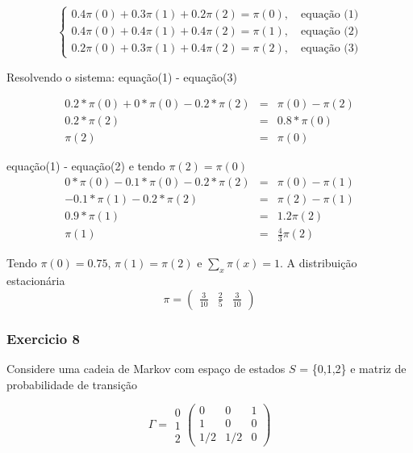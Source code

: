 \documentclass[
]{article}
\begin{document}
\[ \begin{cases}0.4 \pi(0) + 0.3\pi(1) + 0.2\pi(2) = \pi(0), \quad \text{equação (1)} \\
  0.4 \pi(0) + 0.4\pi(1) + 0.4\pi(2) = \pi(1), \quad \text{equação (2)}  \\
  0.2 \pi(0) + 0.3\pi(1) + 0.4\pi(2) = \pi(2), \quad \text{equação (3)}  
  \end{cases}\]

Resolvendo o sistema: equação(1) - equação(3)

\[\begin{array}{rcl} 0.2*\pi(0) + 0*\pi(0) -0.2*\pi(2) &=& \pi(0) -\pi(2)\\
  0.2*\pi(2) &=& 0.8*\pi(0) \\
  \pi(2) &=& \pi(0)
  \end{array} \]

equação(1) - equação(2) e tendo \(\pi(2) = \pi(0)\)
\[ \begin{array}{rcl} 0*\pi(0) - 0.1*\pi(0) -0.2*\pi(2) &=& \pi(0) -\pi(1)\\
  -0.1*\pi(1) - 0.2 * \pi(2) &=& \pi(2) - \pi(1) \\
  0.9*\pi(1)  &=& 1.2 \pi(2) \\
    \pi(1) &=& \frac{4}{3} \pi(2)  \end{array} \]

Tendo \(\pi(0) = 0.75\), \(\pi(1) = \pi(2)\) e \(\sum_{x}\pi(x) = 1\). A
distribuição estacionária \[\pi = 
\begin{pmatrix}
\frac{3}{10}& \frac{2}{5} &  \frac{3}{10} 
\end{pmatrix}\]

\pagebreak

\hypertarget{exercicio-8}{%
\subsubsection{Exercicio 8}\label{exercicio-8}}

Considere uma cadeia de Markov com espaço de estados \(S\) = \{0,1,2\} e
matriz de probabilidade de transição

\[\Gamma =\begin{matrix}
0\\ 
1\\ 
2
\end{matrix}
\begin{pmatrix}
0 & 0 & 1  \\
1 & 0 & 0  \\
1/2 & 1/2 & 0  
\end{pmatrix}\]
\end{document}
